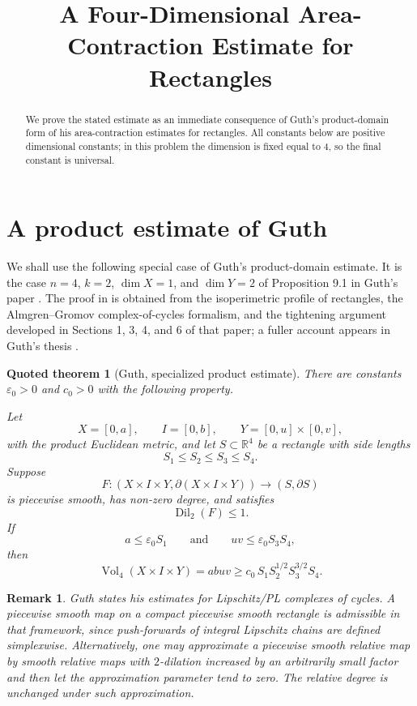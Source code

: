 \documentclass[11pt]{article}
\newtheorem{quotedtheorem}{Quoted theorem}
\newtheorem{remark}{Remark}
\newcommand{\R}{\mathbb{R}}
\newcommand{\Vol}{\operatorname{Vol}}
\newcommand{\Dil}{\operatorname{Dil}}
\begin{document}
\title{A Four-Dimensional Area-Contraction Estimate for Rectangles}
\author{}
\date{}
\maketitle

\begin{abstract}
We prove the stated estimate as an immediate consequence of Guth's
product-domain form of his area-contraction estimates for rectangles.
All constants below are positive dimensional constants; in this problem
the dimension is fixed equal to \(4\), so the final constant is universal.
\end{abstract}

\section{A product estimate of Guth}

We shall use the following special case of Guth's product-domain estimate.
It is the case \(n=4\), \(k=2\), \(\dim X=1\), and \(\dim Y=2\) of
Proposition 9.1 in Guth's paper \cite[Proposition 9.1]{GuthAreaExpanding}.
The proof in \cite{GuthAreaExpanding} is obtained from the isoperimetric
profile of rectangles, the Almgren--Gromov complex-of-cycles formalism,
and the tightening argument developed in Sections 1, 3, 4, and 6 of that
paper; a fuller account appears in Guth's thesis \cite{GuthThesis}.

\begin{quotedtheorem}[Guth, specialized product estimate]\label{qt:guth}
There are constants \(\varepsilon_0>0\) and \(c_0>0\) with the following
property.

Let
\[
X=[0,a],\qquad I=[0,b],\qquad Y=[0,u]\times[0,v],
\]
with the product Euclidean metric, and let \(S\subset \R^4\) be a rectangle
with side lengths
\[
S_1\leq S_2\leq S_3\leq S_4.
\]
Suppose
\[
F:(X\times I\times Y,\partial(X\times I\times Y))\longrightarrow
(S,\partial S)
\]
is piecewise smooth, has non-zero degree, and satisfies
\[
\Dil_2(F)\leq 1.
\]
If
\[
a\leq \varepsilon_0 S_1
\qquad\text{and}\qquad
uv\leq \varepsilon_0 S_3S_4,
\]
then
\[
\Vol_4(X\times I\times Y)
=abuv
\geq
c_0\,S_1S_2^{1/2}S_3^{3/2}S_4.
\]
\end{quotedtheorem}

\begin{remark}
Guth states his estimates for Lipschitz/PL complexes of cycles. A
piecewise smooth map on a compact piecewise smooth rectangle is admissible
in that framework, since push-forwards of integral Lipschitz chains are
defined simplexwise. Alternatively, one may approximate a piecewise smooth
relative map by smooth relative maps with \(2\)-dilation increased by an
arbitrarily small factor and then let the approximation parameter tend to
zero. The relative degree is unchanged under such approximation.
\end{remark}
\end{document}
